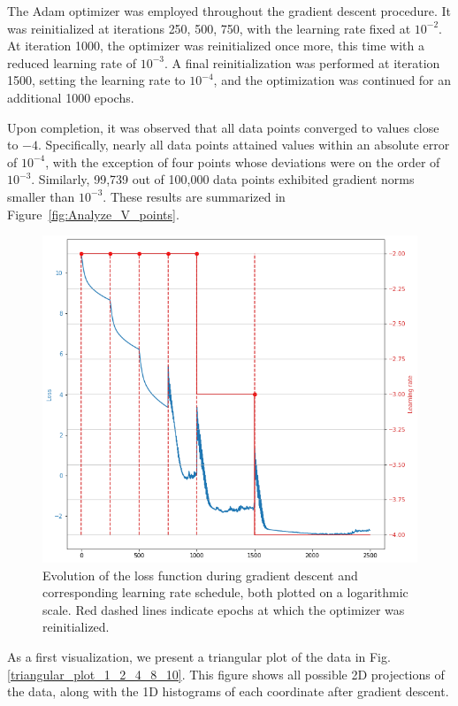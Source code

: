 \documentclass[11pt]{article}
\begin{document}
		The Adam optimizer was employed throughout the gradient descent procedure. It was reinitialized at iterations {250, 500, 750}, with the learning rate fixed at $10^{-2}$. At iteration 1000, the optimizer was reinitialized once more, this time with a reduced learning rate of $10^{-3}$. A final reinitialization was performed at iteration 1500, setting the learning rate to $10^{-4}$, and the optimization was continued for an additional 1000 epochs.
		
		Upon completion, it was observed that all data points converged to values close to $-4$. Specifically, nearly all data points attained values within an absolute error of $10^{-4}$, with the exception of four points whose deviations were on the order of $10^{-3}$. Similarly, 99,739 out of 100,000 data points exhibited gradient norms smaller than $10^{-3}$. These results are summarized in Figure~\ref{fig:Analyze_V_points}.
		
		\begin{figure}
			\centering
			\includegraphics[scale = 0.5]{Figures/Loss_grad_des.png}
			\caption{Evolution of the loss function during gradient descent and corresponding learning rate schedule, both plotted on a logarithmic scale. Red dashed lines indicate epochs at which the optimizer was reinitialized.}
			\label{fig:loss_grad_des}
		\end{figure}
		
		As a first visualization, we present a triangular plot of the data in Fig. \ref{triangular_plot_1_2_4_8_10}. This figure shows all possible 2D projections of the data, along with the 1D histograms of each coordinate after gradient descent.
		
\end{document}

